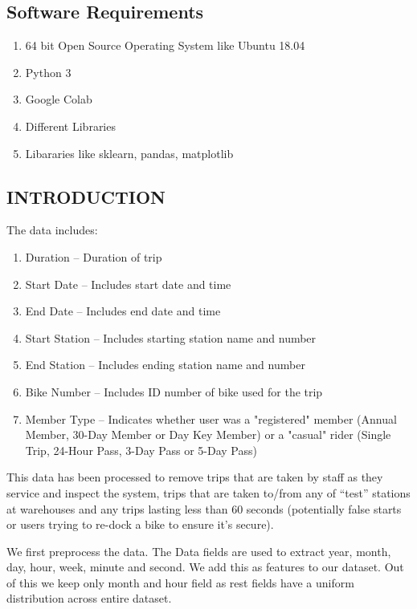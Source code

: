 \documentclass[a4paper, 12pt]{article}
\begin{document}
\subsection{Software Requirements}
\begin{enumerate}
    \item 64 bit Open Source Operating System like Ubuntu 18.04
    \item Python 3
    \item Google Colab
    \item Different Libraries
    \item Libararies like sklearn, pandas, matplotlib
\end{enumerate}
\newpage
\begin{center}
\section{INTRODUCTION}
\end{center}
\hspace{1cm}
\par
The data includes:
\begin{enumerate}
    \item Duration – Duration of trip
    \item Start Date – Includes start date and time
    \item End Date – Includes end date and time
    \item Start Station – Includes starting station name and number
    \item End Station – Includes ending station name and number
    \item Bike Number – Includes ID number of bike used for the trip
    \item Member Type – Indicates whether user was a "registered" member (Annual Member, 30-Day Member or Day Key Member) or a "casual" rider (Single Trip, 24-Hour Pass, 3-Day Pass or 5-Day Pass)
\end{enumerate}

This data has been processed to remove trips that are taken by staff as they service and inspect the system, trips that are taken to/from any of “test” stations at warehouses and any trips lasting less than 60 seconds (potentially false starts or users trying to re-dock a bike to ensure it's secure).

We first preprocess the data. The Data fields are  used to extract year, month, day, hour, week, minute and second. We add this as features to our dataset. Out of this we keep only month and hour field as rest fields have a uniform distribution across entire dataset.
\end{document}
